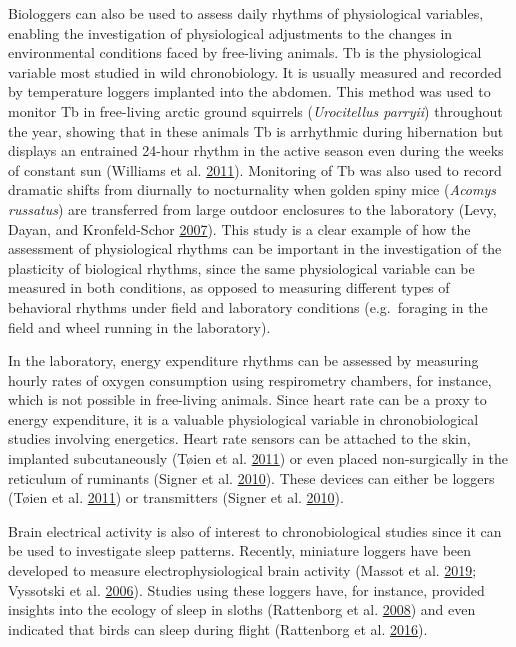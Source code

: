 \documentclass[msc,numbers,hidelinks]{coppe}
\begin{document}
  Biologgers can also be used to assess daily rhythms of physiological variables, enabling the investigation of physiological adjustments to the changes in environmental conditions faced by free-living animals. Tb is the physiological variable most studied in wild chronobiology. It is usually measured and recorded by temperature loggers implanted into the abdomen. This method was used to monitor Tb in free-living arctic ground squirrels (\emph{Urocitellus parryii}) throughout the year, showing that in these animals Tb is arrhythmic during hibernation but displays an entrained 24-hour rhythm in the active season even during the weeks of constant sun (Williams et al. \protect\hyperlink{ref-williamsDataLoggingBody2011}{2011}). Monitoring of Tb was also used to record dramatic shifts from diurnally to nocturnality when golden spiny mice (\emph{Acomys russatus}) are transferred from large outdoor enclosures to the laboratory (Levy, Dayan, and Kronfeld-Schor \protect\hyperlink{ref-levyRelationshipGoldenSpiny2007}{2007}). This study is a clear example of how the assessment of physiological rhythms can be important in the investigation of the plasticity of biological rhythms, since the same physiological variable can be measured in both conditions, as opposed to measuring different types of behavioral rhythms under field and laboratory conditions (e.g.~foraging in the field and wheel running in the laboratory).

  In the laboratory, energy expenditure rhythms can be assessed by measuring hourly rates of oxygen consumption using respirometry chambers, for instance, which is not possible in free-living animals. Since heart rate can be a proxy to energy expenditure, it is a valuable physiological variable in chronobiological studies involving energetics. Heart rate sensors can be attached to the skin, implanted subcutaneously (Tøien et al. \protect\hyperlink{ref-toienHibernationBlackBears2011}{2011}) or even placed non-surgically in the reticulum of ruminants (Signer et al. \protect\hyperlink{ref-signerVersatileTelemetrySystem2010}{2010}). These devices can either be loggers (Tøien et al. \protect\hyperlink{ref-toienHibernationBlackBears2011}{2011}) or transmitters (Signer et al. \protect\hyperlink{ref-signerVersatileTelemetrySystem2010}{2010}).

  Brain electrical activity is also of interest to chronobiological studies since it can be used to investigate sleep patterns. Recently, miniature loggers have been developed to measure electrophysiological brain activity (Massot et al. \protect\hyperlink{ref-massotONEIROSNewMiniature2019}{2019}; Vyssotski et al. \protect\hyperlink{ref-vyssotskiMiniatureNeurologgersFlying2006}{2006}). Studies using these loggers have, for instance, provided insights into the ecology of sleep in sloths (Rattenborg et al. \protect\hyperlink{ref-rattenborgSleepingOutsideBox2008}{2008}) and even indicated that birds can sleep during flight (Rattenborg et al. \protect\hyperlink{ref-rattenborgEvidenceThatBirds2016}{2016}).
\end{document}
